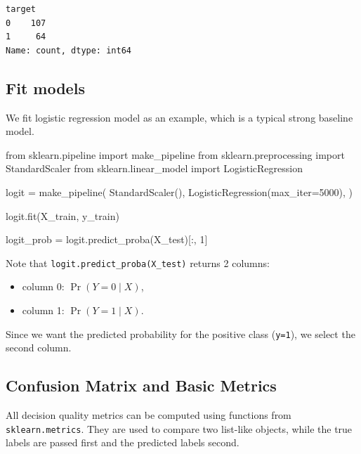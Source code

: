 \documentclass[
  letterpaper,
  DIV=11,
  numbers=noendperiod]{scrreprt}
\newenvironment{Shaded}{\begin{snugshade}}{\end{snugshade}}
\newcommand{\DecValTok}[1]{\textcolor[rgb]{0.68,0.00,0.00}{#1}}
\newcommand{\ImportTok}[1]{\textcolor[rgb]{0.00,0.46,0.62}{#1}}
\newcommand{\NormalTok}[1]{\textcolor[rgb]{0.00,0.23,0.31}{#1}}
\newcommand{\OperatorTok}[1]{\textcolor[rgb]{0.37,0.37,0.37}{#1}}
\providecommand{\tightlist}{%
  \setlength{\itemsep}{0pt}\setlength{\parskip}{0pt}}
\theoremstyle{definition}
\theoremstyle{definition}
\theoremstyle{plain}
\theoremstyle{plain}
\theoremstyle{remark}
\begin{document}
\begin{verbatim}
target
0    107
1     64
Name: count, dtype: int64
\end{verbatim}

\subsection{Fit models}\label{fit-models}

We fit logistic regression model as an example, which is a typical
strong baseline model.

\begin{Shaded}
\begin{Highlighting}[]
\ImportTok{from}\NormalTok{ sklearn.pipeline }\ImportTok{import}\NormalTok{ make\_pipeline}
\ImportTok{from}\NormalTok{ sklearn.preprocessing }\ImportTok{import}\NormalTok{ StandardScaler}
\ImportTok{from}\NormalTok{ sklearn.linear\_model }\ImportTok{import}\NormalTok{ LogisticRegression}

\NormalTok{logit }\OperatorTok{=}\NormalTok{ make\_pipeline(}
\NormalTok{    StandardScaler(),}
\NormalTok{    LogisticRegression(max\_iter}\OperatorTok{=}\DecValTok{5000}\NormalTok{),}
\NormalTok{)}

\NormalTok{logit.fit(X\_train, y\_train)}

\NormalTok{logit\_prob }\OperatorTok{=}\NormalTok{ logit.predict\_proba(X\_test)[:, }\DecValTok{1}\NormalTok{]}
\end{Highlighting}
\end{Shaded}

Note that \texttt{logit.predict\_proba(X\_test)} returns 2 columns:

\begin{itemize}
\tightlist
\item
  column 0: \(\Pr(Y=0\mid X)\),
\item
  column 1: \(\Pr(Y=1\mid X)\).
\end{itemize}

Since we want the predicted probability for the positive class
(\texttt{y=1}), we select the second column.

\subsection{Confusion Matrix and Basic
Metrics}\label{confusion-matrix-and-basic-metrics}

All decision quality metrics can be computed using functions from
\texttt{sklearn.metrics}. They are used to compare two list-like
objects, while the true labels are passed first and the predicted labels
second.
\end{document}
